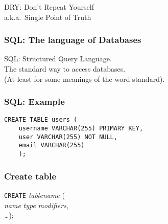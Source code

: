 \begin{frame}[fragile]
{}
DRY: Don't Repeat Yourself\\
a.k.a.\ Single Point of Truth

\end{frame}

\begin{frame}[fragile]
\frametitle{SQL: The language of Databases}

\alert{SQL}: Structured Query Language.\\
The standard way to access databases.\\

\medskip
(At least for some meanings of the word \alert{standard}).
\end{frame}

\begin{frame}[fragile]
\frametitle{SQL: Example}
\begin{verbatim}
CREATE TABLE users (
    username VARCHAR(255) PRIMARY KEY,
    user VARCHAR(255) NOT NULL,
    email VARCHAR(255)
    );
\end{verbatim}
\end{frame}

\begin{frame}[fragile]
\frametitle{Create table}

\texttt{CREATE} \textit{tablename} (\\
    \textit{name} \textit{type} \textit{modifiers},\\
    \ldots);
\end{frame}

